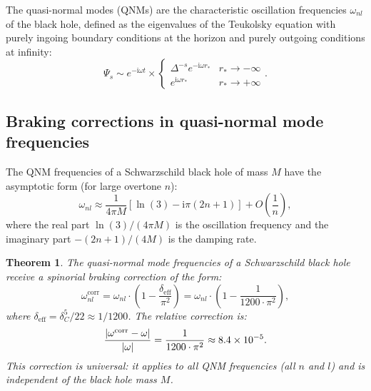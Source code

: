 \documentclass[12pt,a4paper]{article}
\newtheorem{theorem}{Theorem}[section]
\theoremstyle{definition}
\theoremstyle{remark}
\newcommand{\ii}{\mathrm{i}}
\DeclarePairedDelimiter\abs{\lvert}{\rvert}
\begin{document}
The quasi-normal modes (QNMs) are the characteristic oscillation frequencies $\omega_{nl}$ of the black hole, defined as the eigenvalues of the Teukolsky equation with purely ingoing boundary conditions at the horizon and purely outgoing conditions at infinity:
\begin{equation}
\Psi_s \sim e^{-\ii \omega t} \times \begin{cases} \Delta^{-s} e^{-\ii \omega r_*} & r_* \to -\infty \\ e^{\ii \omega r_*} & r_* \to +\infty \end{cases}.
\end{equation}

\subsection{Braking corrections in quasi-normal mode frequencies}

The QNM frequencies of a Schwarzschild black hole of mass $M$ have the asymptotic form (for large overtone $n$):
\begin{equation}
\omega_{nl} \approx \frac{1}{4\pi M}\left[\ln(3) - \ii\pi\left(2n + 1\right)\right] + O\left(\frac{1}{n}\right),
\end{equation}
where the real part $\ln(3)/(4\pi M)$ is the oscillation frequency and the imaginary part $-(2n+1)/(4M)$ is the damping rate.

\begin{theorem}
\label{thm:qnm-braking}
The quasi-normal mode frequencies of a Schwarzschild black hole receive a spinorial braking correction of the form:
\begin{equation}
\omega_{nl}^{\mathrm{corr}} = \omega_{nl} \cdot \left(1 - \frac{\delta_{\mathrm{eff}}}{\pi^2}\right) = \omega_{nl} \cdot \left(1 - \frac{1}{1200 \cdot \pi^2}\right),
\end{equation}
where $\delta_{\mathrm{eff}} = \delta_C^5/22 \approx 1/1200$. The relative correction is:
\begin{equation}
\frac{\abs{\omega^{\mathrm{corr}} - \omega}}{\abs{\omega}} = \frac{1}{1200 \cdot \pi^2} \approx 8.4 \times 10^{-5}.
\end{equation}
This correction is universal: it applies to all QNM frequencies (all $n$ and $l$) and is independent of the black hole mass $M$.
\end{theorem}
\end{document}
